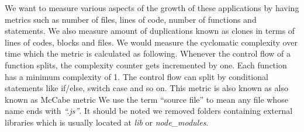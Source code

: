 \par
We want to measure various aspects of the growth of these applications by having metrics such as number of files, lines of code, number of functions and statements. We also measure amount of duplications known as clones in terms of lines of codes, blocks and files. We would measure the cyclomatic complexity over time which the metric is calculated as following. Whenever the control flow of a function splits, the complexity counter gets incremented by one. Each function has a minimum complexity of 1. The control flow can split by conditional statements like if/else, switch case and so on. This metric is also known as also known as McCabe metric
We use the term “source file” to mean any file whose name ends with \textit{“.js”}. It should be noted we removed folders containing external libraries which is usually located at \textit{lib} or \textit{node\_modules}. 




